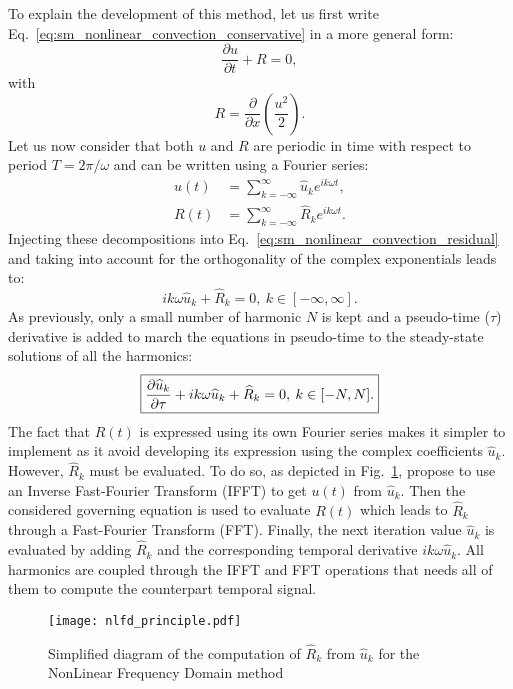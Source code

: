 To explain the development of this method, let us first 
write Eq.~\ref{eq:sm_nonlinear_convection_conservative} 
in a more general form:
\begin{equation}
	\frac{\partial u}{\partial t} + R = 0,
	\label{eq:sm_nonlinear_convection_residual}
\end{equation}
with
\begin{equation}
	R = \frac{\partial}{\partial x} \left( 
	\frac{u^2}{2} \right).
\end{equation}
Let us now consider that both $u$ and $R$ are periodic
in time with respect to period $T = 2 \pi / \omega$
and can be written using a Fourier series:
\begin{equation}
	\begin{split}
		u(t) &= \sum_{k=-\infty}^{\infty} \widehat{u}_k e^{i k \omega t}, \\
		R(t) &= \sum_{k=-\infty}^{\infty} \widehat{R}_k e^{i k \omega t}.
	\end{split}
\end{equation}
Injecting these decompositions into 
Eq.~\ref{eq:sm_nonlinear_convection_residual} and taking into account
for the orthogonality of the complex exponentials leads to:
\begin{equation}
	i k \omega \widehat{u}_k + \widehat{R}_k = 0, \: k \in [-\infty, \infty].
\end{equation}
As previously, only a small number of harmonic $N$ is kept and 
a pseudo-time ($\tau$) derivative is added to march the equations
in pseudo-time to the steady-state solutions of all the harmonics:
\begin{equation}
	\fbox{$
	\displaystyle \frac{\partial \widehat{u}_k}{\partial \tau} + 
	i k \omega \widehat{u}_k + \widehat{R}_k = 0, \: k \in [-N, N].
	$}
	\label{eq:sm_nlfd_subset_eq}
\end{equation}
The fact that $R(t)$ is expressed using its own Fourier series 
makes it simpler to implement 
as it avoid developing its expression using 
the complex coefficients $\widehat{u}_k$.
However, $\widehat{R}_k$ must be evaluated. To do so, as depicted
in Fig.~\ref{fig:nlfd_principle}, \citet{McMullen2001}
propose to use an Inverse Fast-Fourier Transform (IFFT) to get
$u(t)$ from $\widehat{u}_k$. Then the considered governing equation
is used to evaluate $R(t)$ which leads to $\widehat{R}_k$
through a Fast-Fourier Transform (FFT). Finally, the next iteration value 
$\widehat{u}_k$
is evaluated by adding $\widehat{R}_k$ and 
the corresponding temporal derivative $i k \omega \widehat{u}_k$. All
harmonics are coupled through the IFFT and FFT operations
that needs all of them to compute the counterpart temporal signal.
\begin{figure}[htbp]
  \centering
  \texttt{[image: nlfd\_principle.pdf]}
  \caption{Simplified diagram of the computation of $\widehat{R}_k$ from $\widehat{u}_k$
  for the NonLinear Frequency Domain method}
  \label{fig:nlfd_principle}
\end{figure}

